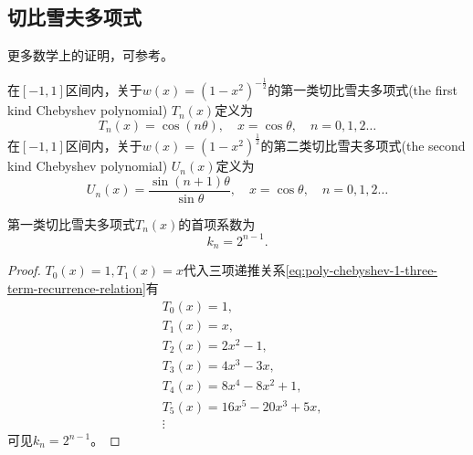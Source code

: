 \begin{subappendices}
\subsection{切比雪夫多项式}
\label{sec:poly-chebyshev-polynomial}

更多数学上的证明，可参考\cite{Boyd:2001wt,Fornberg:1996to,Mason:2003tc,Shen:2011tf}。

在$[-1, 1]$区间内，关于$w(x) = \left(1-x^2 \right)^{-\frac{1}{2}}$的第一类切比雪夫多项式(the first kind Chebyshev polynomial) $T_n(x)$定义为
  \begin{equation}
    \label{eq:poly-chebyshev-1-def}
    T_n(x)= \cos (n \theta), \quad x = \cos \theta, \quad n = 0,1,2 \ldots
  \end{equation}
  在$[-1, 1]$区间内，关于$w(x) = \left(1-x^2 \right)^{\frac{1}{2}}$的第二类切比雪夫多项式(the second kind Chebyshev polynomial) $U_n(x)$定义为
  \begin{equation}
    \label{eq:poly-chebyshev-2-def}
    U_n(x)= \frac{\sin (n+1) \theta }{\sin \theta}, \quad x = \cos \theta, \quad n = 0,1,2 \ldots
  \end{equation}

  \begin{theorem}
    第一类切比雪夫多项式$T_n(x)$的首项系数为
    \begin{equation}
      \label{eq:poly-chebishev-10-leading-coefficient}
      k_n = 2^{n-1}.
    \end{equation}
  \end{theorem}
  \begin{proof}
    $T_0(x)=1, T_1(x)=x$代入三项递推关系\eqref{eq:poly-chebyshev-1-three-term-recurrence-relation}有
    \begin{equation*}
      \begin{split}
        &T_0(x) = 1, \\
        &T_1(x) = x, \\
        &T_2(x) = 2x^2 - 1,\\
        &T_3(x) = 4x^3 - 3x,\\
        &T_4(x) = 8 x ^4 - 8x ^2 + 1,\\
        &T_5(x) = 16x^5 - 20 x ^3 + 5x, \\
        &\vdots
      \end{split}
    \end{equation*}
    可见$k_n = 2^{n-1}$。
  \end{proof}



\end{subappendices}

